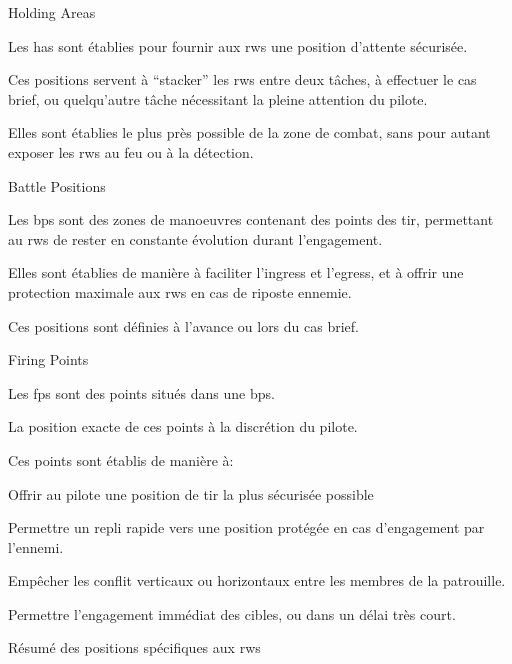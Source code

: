 \begin{e1}
	\item Holding Areas

	\begin{e2}
		\item Les \glspl{ha} sont établies pour fournir aux \glspl{rw} une position d'attente sécurisée.
		\item Ces positions servent à “stacker” les \glspl{rw} entre deux tâches, à effectuer le \gls{cas} brief, ou quelqu'autre tâche nécessitant la pleine attention du pilote.
		\item Elles sont établies le plus près possible de la zone de combat, sans pour autant exposer les \glspl{rw} au feu ou à la détection.
	\end{e2}

	\item Battle Positions

	\begin{e2}
		\item Les \glspl{bp} sont des zones de manoeuvres contenant des points des tir, permettant au \glspl{rw} de rester en constante évolution durant l'engagement.
		\item Elles sont établies de manière à faciliter l'ingress et l'egress, et à offrir une protection maximale aux \glspl{rw} en cas de riposte ennemie.
		\item Ces positions sont définies à l'avance ou lors du \gls{cas} brief.
	\end{e2}

	\item Firing Points

	\begin{e2}
		\item Les \glspl{fp} sont des points situés dans une \glspl{bp}.
		\item La position exacte de ces points à la discrétion du pilote.
		\item Ces points sont établis de manière à:
		\begin{e3}
			\item Offrir au pilote une position de tir la plus sécurisée possible
			\item Permettre un repli rapide vers une position protégée en cas d'engagement par l'ennemi.
			\item Empêcher les conflit verticaux ou horizontaux entre les membres de la patrouille.
			\item Permettre l'engagement immédiat des cibles, ou dans un délai très court.
		\end{e3}
	\end{e2}
	\item Résumé des positions spécifiques aux \glspl{rw}


\end{e1}

